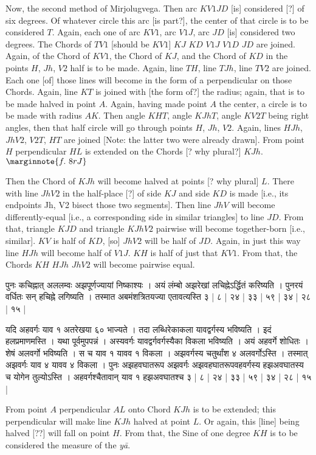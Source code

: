 \documentclass[11pt,a5paper]{book}
\def\ya{\textit{y\=a}}
\begin{document}
\newpage
Now, the second method of Mirjolugvega. Then arc $KV1JD$ [is] considered [?] of six degrees.
Of whatever circle this arc [is part?], the center of that circle is to be considered $T$. Again, 
each one of arc $KV1$, arc $V1J$, arc $JD$ [is] considered two degrees. The Chords
of $TV1$ [should be $KV1$] $KJ$ $KD$ $V1J$ $V1D$ $JD$ are joined. Again, of the Chord of $KV1$,
the Chord of $KJ$, and the Chord of $KD$ in the points $H$, $Jh$, $V2$ half  is to be made.
Again, line $TH$, line $TJh$, line $TV2$ are  joined. Each one [of] those lines 
will become in the form of a perpendicular on those Chords. 
Again, line $KT$ is joined with [the form of?] the radius; again, that is to be made halved
in point $A$. Again, having made point $A$ the center, a circle is to be made with
radius $AK$. Then angle $KHT$, angle $KJhT$, angle $KV2T$ being right angles, 
then  that half circle will go through points $H$, $Jh$, $V2$. 
Again, lines $HJh$, $JhV2$, $V2T$, $HT$ are joined [Note: the latter two were already
drawn]. From 
point $H$ perpendicular $HL$ is extended on the Chords [? why plural?] $KJh$. 
$\marginnote{f.~8r J}$

Then the Chord of $KJh$ will become halved at points [? why plural] $L$. There with line $JhV2$ 
in the half-place [?] of side $KJ$ and side $KD$ is made [i.e., its endpoints Jh, V2 bisect those 
two segments]. Then line $JhV$ will
become differently-equal [i.e., a corresponding side in similar triangles]
to line $JD$. From that, triangle $KJD$ and triangle
$KJhV2$ pairwise will become together-born [i.e., similar]. 
$KV$ is half of $KD$, [so] $JhV2$ will be half of $JD$.
Again, in just this way line $HJh$ will become half of $V1 J$. $KH$ is half of just that $KV1$.
From that, the Chords $KH$ $HJh$ $JhV2$ will become pairwise equal. 
\newpage
{\s पुनः कचिह्नात् अललम्वः अझपूर्णज्यायां निष्काश्यः । अयं लंम्बो अझरेखां लचिह्नेऽर्द्धितं करिष्यति । 
पुनरयं वर्धितः सन् हचिह्ने लगिष्यति । तस्मात अबमंशत्रितयज्या एतावत्यस्ति ३ | ८ | २४ | ३३ | ५९ | ३४ | २८ | १५ | 

यदि अहवर्गः याव १ अतरेखया ६० भाज्यते । तदा लब्धिरेकाकला यावद्वर्गस्य भविष्यति । इदं हलप्रमाणमस्ति । 
यथा पूर्वमुपपन्नं । अस्यवर्गः यावद्वर्गवर्गस्यैका  
विकला भविष्यति । अयं अहवर्गे शोधितः । शेषं अलवर्गो भविष्यति । स च याव १ यावव १ विकला । अझवर्गस्य चतुर्थांश ४ 
अलवर्गोऽस्ति । तस्मात् अझवर्गः याव ४ यावव ४ विकला । पुनः अझहवघातरूप
अझवर्गः अझवहघातरूपवहवर्गस्य हझअवघातस्य च योगेन तुल्योऽस्ति ।
अहवर्गश्चैतावान् याव १ हझअवघातश्च ३ | ८ | २४ | ३३ | ५९ | ३४ | २८ | १५ |}  
\newpage
From point $A$ perpendicular $AL$ onto Chord $KJh$ is to be extended; this perpendicular 
will make line $KJh$ halved at point $L$. Or again, this [line] being halved [??] will fall on point $H$.
From that, the Sine of one degree $KH$ is to be considered the measure of the \ya. 
\end{document}
